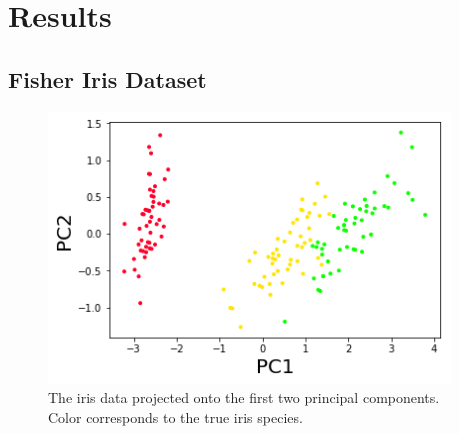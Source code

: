 \documentclass[a0,plainsections,30pt]{sciposter}\usepackage[]{graphicx}\usepackage[]{color}
\begin{document}
\begin{minipage}[t]{0.45\textwidth}




\section*{Results}
\vspace{-0.3in}

\begin{minipage}[t]{0.49\textwidth}
    \subsection*{Fisher Iris Dataset}
    \begin{figure}[!h]
    \centering
    \includegraphics[width = 0.95\textwidth]{./static_images/iris_data.png}
    \caption{The iris data projected onto the first two principal components. Color corresponds to the true iris species.}
    \setlength{\textfloatsep}{-10pt}
    \end{figure}
\end{minipage}
%
\begin{minipage}[t]{0.49\textwidth}

\end{minipage}
\end{minipage}
\end{document}
